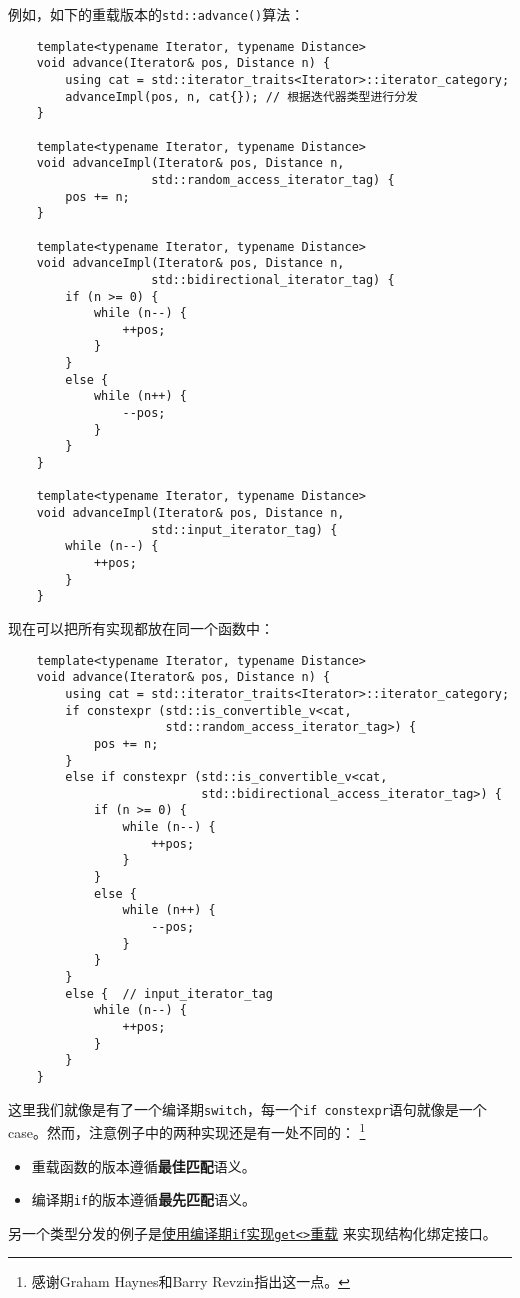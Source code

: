 例如，如下的重载版本的\texttt{std::advance()}算法：
\begin{lstlisting}
    template<typename Iterator, typename Distance>
    void advance(Iterator& pos, Distance n) {
        using cat = std::iterator_traits<Iterator>::iterator_category;
        advanceImpl(pos, n, cat{}); // 根据迭代器类型进行分发
    }

    template<typename Iterator, typename Distance>
    void advanceImpl(Iterator& pos, Distance n,
                    std::random_access_iterator_tag) {
        pos += n;
    }

    template<typename Iterator, typename Distance>
    void advanceImpl(Iterator& pos, Distance n,
                    std::bidirectional_iterator_tag) {
        if (n >= 0) {
            while (n--) {
                ++pos;
            }
        }
        else {
            while (n++) {
                --pos;
            }
        }
    }

    template<typename Iterator, typename Distance>
    void advanceImpl(Iterator& pos, Distance n,
                    std::input_iterator_tag) {
        while (n--) {
            ++pos;
        }
    }
\end{lstlisting}
现在可以把所有实现都放在同一个函数中：
\begin{lstlisting}
    template<typename Iterator, typename Distance>
    void advance(Iterator& pos, Distance n) {
        using cat = std::iterator_traits<Iterator>::iterator_category;
        if constexpr (std::is_convertible_v<cat,
                      std::random_access_iterator_tag>) {
            pos += n;
        }
        else if constexpr (std::is_convertible_v<cat,
                           std::bidirectional_access_iterator_tag>) {
            if (n >= 0) {
                while (n--) {
                    ++pos;
                }
            }
            else {
                while (n++) {
                    --pos;
                }
            }
        }
        else {  // input_iterator_tag
            while (n--) {
                ++pos;
            }
        }
    }
\end{lstlisting}
这里我们就像是有了一个编译期\texttt{switch}，每一个\texttt{if constexpr}语句就像是一个
case。然而，注意例子中的两种实现还是有一处不同的：
\footnote{感谢Graham Haynes和Barry Revzin指出这一点。}
\begin{itemize}[leftmargin=*]
    \item 重载函数的版本遵循\textbf{最佳匹配}语义。
    \item 编译期\texttt{if}的版本遵循\textbf{最先匹配}语义。
\end{itemize}
另一个类型分发的例子是\hyperref[编译期if实现get<>]{使用编译期\texttt{if}实现\texttt{get<>}重载}
来实现结构化绑定接口。

